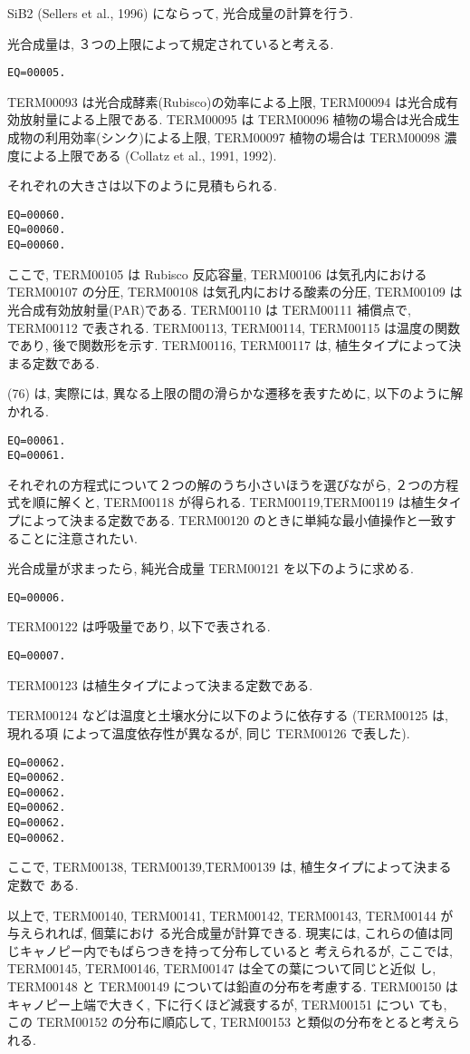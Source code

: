 SiB2 (Sellers et al., 1996) にならって, 光合成量の計算を行う.

光合成量は, ３つの上限によって規定されていると考える.
\begin{verbatim}
EQ=00005.
\end{verbatim}
TERM00093 は光合成酵素(Rubisco)の効率による上限,
TERM00094 は光合成有効放射量による上限である.
TERM00095 は TERM00096 植物の場合は光合成生成物の利用効率(シンク)による上限,
TERM00097 植物の場合は TERM00098 濃度による上限である
(Collatz et al., 1991, 1992).

それぞれの大きさは以下のように見積もられる.
\begin{verbatim}
EQ=00060.
EQ=00060.
EQ=00060.
\end{verbatim}
ここで, TERM00105 は Rubisco 反応容量, TERM00106 は気孔内における TERM00107 の分圧,
TERM00108 は気孔内における酸素の分圧, TERM00109 は光合成有効放射量(PAR)である.
TERM00110 は TERM00111 補償点で, TERM00112 で表される.
TERM00113, TERM00114, TERM00115 は温度の関数であり, 後で関数形を示す.
TERM00116, TERM00117 は, 植生タイプによって決まる定数である.

(76) は, 実際には, 異なる上限の間の滑らかな遷移を表すために,
以下のように解かれる.
\begin{verbatim}
EQ=00061.
EQ=00061.
\end{verbatim}
それぞれの方程式について２つの解のうち小さいほうを選びながら, ２つの方程
式を順に解くと, TERM00118 が得られる.
TERM00119,TERM00119 は植生タイプによって決まる定数である. TERM00120
のときに単純な最小値操作と一致することに注意されたい.

光合成量が求まったら, 純光合成量 TERM00121 を以下のように求める.
\begin{verbatim}
EQ=00006.
\end{verbatim}
TERM00122 は呼吸量であり, 以下で表される.
\begin{verbatim}
EQ=00007.
\end{verbatim}
TERM00123 は植生タイプによって決まる定数である.

TERM00124 などは温度と土壌水分に以下のように依存する (TERM00125 は, 現れる項
によって温度依存性が異なるが, 同じ TERM00126 で表した).
\begin{verbatim}
EQ=00062.
EQ=00062.
EQ=00062.
EQ=00062.
EQ=00062.
EQ=00062.
\end{verbatim}
ここで, TERM00138, TERM00139,TERM00139 は, 植生タイプによって決まる定数で
ある.

以上で, TERM00140, TERM00141, TERM00142, TERM00143, TERM00144 が与えられれば, 個葉におけ
る光合成量が計算できる.
現実には, これらの値は同じキャノピー内でもばらつきを持って分布していると
考えられるが, ここでは, TERM00145, TERM00146, TERM00147 は全ての葉について同じと近似
し, TERM00148 と TERM00149 については鉛直の分布を考慮する.
TERM00150 はキャノピー上端で大きく, 下に行くほど減衰するが, TERM00151 につい
ても, この TERM00152 の分布に順応して, TERM00153 と類似の分布をとると考えられる.

